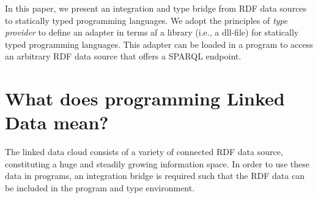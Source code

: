 \documentclass{llncs} %
\begin{document}
%
%
%
%

In this paper, we present an integration and type bridge from RDF data sources to
statically typed programming languages. We adopt the principles of \emph{type provider}
to define an adapter in terms af a library (i.e., a dll-file) for statically typed programming languages. This adapter can
be loaded in a program to access an arbitrary RDF data source that offers a SPARQL endpoint.


\section{What does programming Linked Data mean?}
\label{sec:context}


The linked data cloud consists of a variety of connected RDF data source, constituting a huge and steadily growing information space.
In order to use these data in programs, an integration bridge is required such that
the RDF data can be included in the program and type environment.
\end{document}
